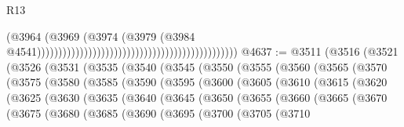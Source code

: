 \begin{lexlean}{R13}
\begin{coremodule}
                                                                                        (@3964
                                                                                          (@3969
                                                                                            (@3974
                                                                                              (@3979
                                                                                                (@3984
                                                                                                  @4541)))))))))))))))))))))))))))))))))))))))))))))))
@4637 := @3511
    (@3516
      (@3521
        (@3526
          (@3531
            (@3535
              (@3540
                (@3545
                  (@3550
                    (@3555
                      (@3560
                        (@3565
                          (@3570
                            (@3575
                              (@3580
                                (@3585
                                  (@3590
                                    (@3595
                                      (@3600
                                        (@3605
                                          (@3610
                                            (@3615
                                              (@3620
                                                (@3625
                                                  (@3630
                                                    (@3635
                                                      (@3640
                                                        (@3645
                                                          (@3650
                                                            (@3655
                                                              (@3660
                                                                (@3665
                                                                  (@3670
                                                                    (@3675
                                                                      (@3680
                                                                        (@3685
                                                                          (@3690
                                                                            (@3695
                                                                              (@3700
                                                                                (@3705
                                                                                  (@3710

\end{coremodule}
\end{lexlean}
